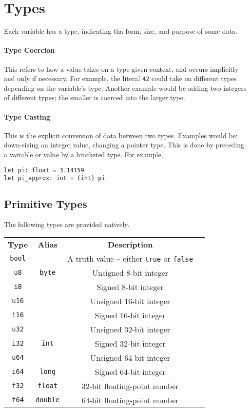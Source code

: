 \documentclass{article}
\begin{document}
\section{Types}

Each variable has a type, indicating tha form, size, and purpose of some data.

\paragraph*{Type Coercion}
This refers to how a value takes on a type given context, and occurs implicitly and only if necessary.
For example, the literal \texttt{42} could take on different types depending on the variable's type.
Another example would be adding two integers of different types; the smaller is coerced into the larger type.

\paragraph*{Type Casting}
This is the explicit conversion of data between two types.
Examples would be: down-sizing an integer value, changing a pointer type.
This is done by preceding a variable or value by a bracketed type.
For example,

\begin{lstlisting}[language=CustomLang]
let pi: float = 3.14159
let pi_approx: int = (int) pi
\end{lstlisting}

\subsection{Primitive Types}

The following types are provided natively.

\begin{tabular}{|c|c|c|l|}
    \hline
    \textbf{Type} & \textbf{Alias} & \textbf{Description} \\
    \texttt{bool} & & A truth value -- either \texttt{true} or \texttt{false} \\
    \hline
    \hline
    \texttt{u8} & \texttt{byte} & Unsigned 8-bit integer \\
    \texttt{i8} & & Signed 8-bit integer \\
    \hline
    \texttt{u16} & & Unsigned 16-bit integer \\
    \texttt{i16} & & Signed 16-bit integer \\
    \hline
    \texttt{u32} & & Unsigned 32-bit integer \\
    \texttt{i32} & \texttt{int} & Signed 32-bit integer \\
    \hline
    \texttt{u64} & & Unsigned 64-bit integer \\
    \texttt{i64} & \texttt{long} & Signed 64-bit integer \\
    \hline
    \texttt{f32} & \texttt{float} & 32-bit floating-point number \\
    \texttt{f64} & \texttt{double} & 64-bit floating-point number \\
    \hline
\end{tabular}
\end{document}
